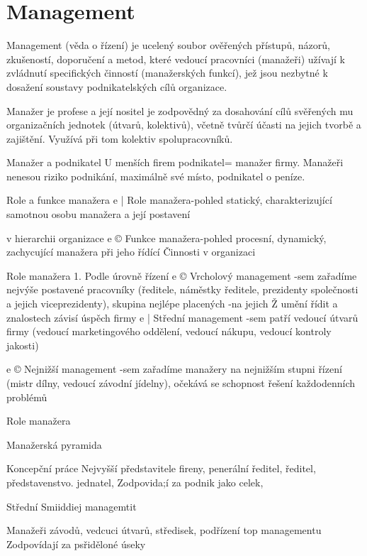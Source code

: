 \chapter{Management}

Management (věda o řízení) je ucelený soubor ověřených přístupů, názorů, zkušeností,
doporučení a metod, které vedoucí pracovníci (manažeři) užívají k zvládnutí specifických
činností (manažerských funkcí), jež jsou nezbytné k dosažení soustavy podnikatelských cílů
organizace.

Manažer je profese a její nositel je zodpovědný za dosahování cílů svěřených mu
organizačních jednotek (útvarů, kolektivů), včetně tvůrčí účasti na jejich tvorbě a zajištění.
Využívá při tom kolektiv spolupracovníků.

Manažer a podnikatel
U menších firem podnikatel= manažer firmy.
Manažeři nenesou riziko podnikání, maximálně své místo, podnikatel o peníze.

Role a funkce manažera
e | Role manažera-pohled statický, charakterizující samotnou osobu manažera a její postavení



v hierarchii organizace
e © Funkce manažera-pohled procesní, dynamický, zachycující manažera při jeho řídící
Činnosti v organizaci

Role manažera
1. Podle úrovně řízení
e © Vrcholový management
-sem zařadíme nejvýše postavené pracovníky (ředitele, náměstky ředitele, prezidenty
společnosti a jejich viceprezidenty), skupina nejlépe placených
-na jejich Ž umění řídit a znalostech závisí úspěch firmy
e | Střední management
-sem patří vedoucí útvarů firmy (vedoucí marketingového oddělení, vedoucí nákupu,
vedoucí kontroly jakosti)



e © Nejnižší management
-sem zařadíme manažery na nejnižším stupni řízení (mistr dílny, vedoucí závodní
jídelny), očekává se schopnost řešení každodenních problémů

Role manažera

Manažerská pyramida








Koncepční práce
Nejvyšší představitele fireny, penerální
ředitel, ředitel, představenstvo. jednatel,
Zodpovida;í za podnik jako celek,



Střední
Smiiddiej
managemtit

Manažeři závodů, vedcuci útvarů,
středisek, podřízení top managementu
Zodpovídají za psřiděloné úseky



